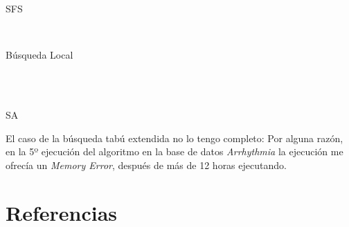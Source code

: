 \documentclass[a4paper, 11pt]{article}
\begin{document}
    \centerline{SFS}
    
    \\ \centerline{Búsqueda Local}
    \\
    \\ \centerline{SA}
    

    El caso de la búsqueda tabú extendida no lo tengo completo: Por alguna razón, en la 5º ejecución del algoritmo en la base de datos \emph{Arrhythmia} la ejecución me ofrecía un \emph{Memory Error}, después de más de 12 horas ejecutando.

  \section{Referencias}
\end{document}
